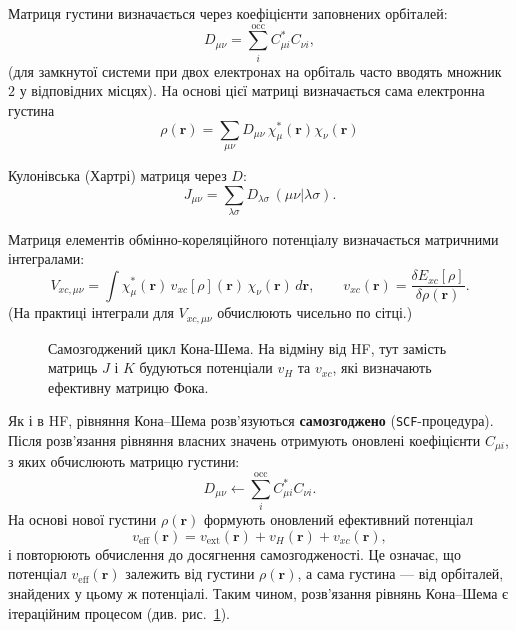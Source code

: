 Матриця густини визначається через коефіцієнти заповнених орбіталей:
\begin{equation*}
	D_{\mu\nu} = \sum_{i}^{\mathrm{occ}} C_{\mu i}^* C_{\nu i},
\end{equation*}
(для замкнутої системи при двох електронах на орбіталь часто вводять множник \(2\) у відповідних місцях).
На основі цієї матриці визначається сама електронна густина
\begin{equation*}
	\rho(\mathbf{r}) = \sum_{\mu\nu} D_{\mu\nu}\,\chi_\mu^*(\mathbf r)\chi_\nu(\mathbf r)
\end{equation*}

Кулонівська (Хартрі) матриця через \(D\):
\begin{equation*}
	J_{\mu\nu} = \sum_{\lambda\sigma} D_{\lambda\sigma}\,(\mu\nu|\lambda\sigma).
\end{equation*}

Матриця елементів обмінно-кореляційного потенціалу визначається матричними інтегралами:
\begin{equation*}
	V_{xc,\mu\nu} = \int \chi_\mu^*(\mathbf r)\, v_{xc}[\rho](\mathbf r)\, \chi_\nu(\mathbf r)\, d\mathbf r,
	\qquad v_{xc}(\mathbf r)=\frac{\delta E_{xc}[\rho]}{\delta\rho(\mathbf r)}.
\end{equation*}
(На практиці інтеграли для \(V_{xc,\mu\nu}\) обчислюють чисельно по сітці.)

\begin{figure}[h!]\centering
	
	\caption{Самозгоджений цикл Кона-Шема. На відміну від HF, тут замість матриць $J$ і $K$ будуються потенціали $v_H$ та $v_{xc}$, які визначають ефективну матрицю Фока.}
	\label{fig:dft_cycle}
\end{figure}

Як і в HF, рівняння Кона--Шема розв’язуються \textbf{самозгоджено} (\texttt{SCF}-процедура).
Після розв'язання рівняння власних значень отримують оновлені коефіцієнти \(C_{\mu i}\),
з яких обчислюють матрицю густини:
\begin{equation*}
    D_{\mu\nu} \leftarrow \sum_{i}^{\mathrm{occ}} C_{\mu i}^* C_{\nu i}.
\end{equation*}
%
На основі нової густини \(\rho(\mathbf r)\) формують оновлений ефективний потенціал
\begin{equation*}
	v_{\text{eff}}(\mathbf{r}) = v_{\text{ext}}(\mathbf{r}) + v_H(\mathbf{r}) + v_{xc}(\mathbf{r}),
\end{equation*}
і повторюють обчислення до досягнення самозгодженості.
Це означає, що потенціал \(v_{\text{eff}}(\mathbf r)\) залежить від густини \(\rho(\mathbf r)\),
а сама густина --- від орбіталей, знайдених у цьому ж потенціалі.
Таким чином, розв’язання рівнянь Кона--Шема є ітераційним процесом
(див. рис.~\ref{fig:dft_cycle}).

